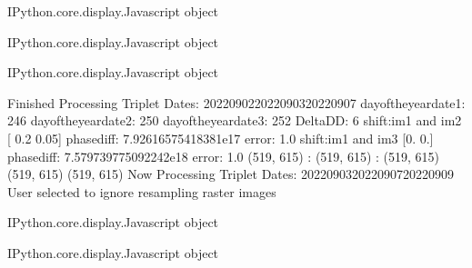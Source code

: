 \documentclass[letterpaper,10pt]{sphinxmanual}
\begin{document}
\begin{sphinxVerbatim}[commandchars=\\\{\}]
\PYGZlt{}IPython.core.display.Javascript object\PYGZgt{}
\end{sphinxVerbatim}



\begin{sphinxVerbatim}[commandchars=\\\{\}]
\PYGZlt{}IPython.core.display.Javascript object\PYGZgt{}
\end{sphinxVerbatim}



\begin{sphinxVerbatim}[commandchars=\\\{\}]
\PYGZlt{}IPython.core.display.Javascript object\PYGZgt{}
\end{sphinxVerbatim}



\begin{sphinxVerbatim}[commandchars=\\\{\}]
Finished Processing Triplet Dates:  20220902\PYGZhy{}20220903\PYGZhy{}20220907
day\PYGZus{}of\PYGZus{}the\PYGZus{}year\PYGZus{}date1:  246
\PYGZhy{}\PYGZhy{}\PYGZhy{}\PYGZhy{}\PYGZhy{}\PYGZhy{}\PYGZhy{}\PYGZhy{}\PYGZhy{}\PYGZhy{}\PYGZhy{}\PYGZhy{}\PYGZhy{}\PYGZhy{}\PYGZhy{}\PYGZhy{}\PYGZhy{}\PYGZhy{}\PYGZhy{}\PYGZhy{}\PYGZhy{}
day\PYGZus{}of\PYGZus{}the\PYGZus{}year\PYGZus{}date2:  250
\PYGZhy{}\PYGZhy{}\PYGZhy{}\PYGZhy{}\PYGZhy{}\PYGZhy{}\PYGZhy{}\PYGZhy{}\PYGZhy{}\PYGZhy{}\PYGZhy{}\PYGZhy{}\PYGZhy{}\PYGZhy{}\PYGZhy{}\PYGZhy{}\PYGZhy{}\PYGZhy{}\PYGZhy{}\PYGZhy{}\PYGZhy{}
day\PYGZus{}of\PYGZus{}the\PYGZus{}year\PYGZus{}date3:  252
\PYGZhy{}\PYGZhy{}\PYGZhy{}\PYGZhy{}\PYGZhy{}\PYGZhy{}\PYGZhy{}\PYGZhy{}\PYGZhy{}\PYGZhy{}\PYGZhy{}\PYGZhy{}\PYGZhy{}\PYGZhy{}\PYGZhy{}\PYGZhy{}\PYGZhy{}\PYGZhy{}\PYGZhy{}\PYGZhy{}\PYGZhy{}
Delta\PYGZus{}DD: 6
shift:im1 and im2 [ 0.2  \PYGZhy{}0.05] phasediff: \PYGZhy{}7.92616575418381e\PYGZhy{}17 error: 1.0
shift:im1 and im3 [0. 0.] phasediff: 7.579739775092242e\PYGZhy{}18 error: 1.0
(519, 615) :  (519, 615) :  (519, 615)
(519, 615)
(519, 615)
Now Processing Triplet Dates:  20220903\PYGZhy{}20220907\PYGZhy{}20220909
 User selected to ignore resampling raster images 



\PYGZlt{}IPython.core.display.Javascript object\PYGZgt{}
\end{sphinxVerbatim}



\begin{sphinxVerbatim}[commandchars=\\\{\}]
\PYGZlt{}IPython.core.display.Javascript object\PYGZgt{}
\end{sphinxVerbatim}
\end{document}
